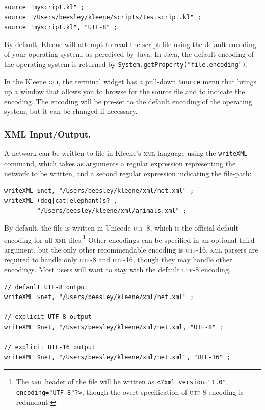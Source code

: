 \documentclass[letterpaper,12pt]{article}
\newcommand{\acro}{\textsc}
\begin{document}
\begin{Verbatim}[fontsize=\small]
source "myscript.kl" ;
source "/Users/beesley/kleene/scripts/testscript.kl" ;
source "myscript.kl", "UTF-8" ;
\end{Verbatim}

By default, Kleene will attempt to read the script file using the default
encoding of your operating system, as perceived by Java. In Java,
the default encoding of the operating system is returned by
\texttt{System.getProperty("file.encoding")}. 

In the Kleene \acro{gui}, the terminal widget has a pull-down \verb!Source!
menu that brings up a window that allows you to browse for the source file and
to indicate the encoding.  The encoding will be pre-set to the default encoding
of the operating system, but it can be changed if necessary.

\subsubsection{XML Input/Output.}

A network can be written to file in Kleene's 
\acro{xml} language using the \texttt{writeXML} command,
which takes as arguments a regular expression representing the network to be
written, and a second regular expression indicating the file-path:

\begin{Verbatim}[fontsize=\small]
writeXML $net, "/Users/beesley/kleene/xml/net.xml" ;
writeXML (dog|cat|elephant)s? , 
         "/Users/beesley/kleene/xml/animals.xml" ;
\end{Verbatim}

By default, the file is written in Unicode \acro{utf-8}, which is the
official default encoding for all \acro{xml} files.\footnote{The
\acro{xml} header of the file will be written as \texttt{<?xml
version="1.0" encoding="UTF-8"?>}, though the overt specification of
\acro{utf-8} encoding is redundant.}  Other encodings can be specified in
an optional third argument, but the only other recommendable encoding is
\acro{utf-16}.  \acro{xml} parsers are required to handle only
\acro{utf-8} and \acro{utf-16}, though they may handle other encodings.
Most users will want to stay with the default \acro{utf-8} encoding.

\begin{Verbatim}[fontsize=\small]
// default UTF-8 output
writeXML $net, "/Users/beesley/kleene/xml/net.xml" ;

// explicit UTF-8 output
writeXML $net, "/Users/beesley/kleene/xml/net.xml, "UTF-8" ;

// explicit UTF-16 output
writeXML $net, "/Users/beesley/kleene/xml/net.xml", "UTF-16" ;
\end{Verbatim}
\end{document}
